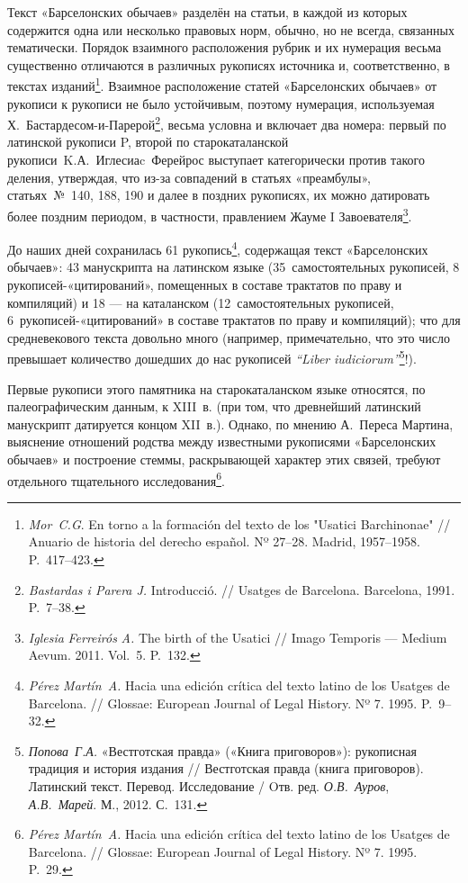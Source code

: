 Текст «Барселонских обычаев» разделён на статьи, в каждой из которых содержится одна или несколько правовых норм, обычно, но не всегда, связанных тематически. Порядок взаимного расположения рубрик и их нумерация весьма существенно отличаются в различных рукописях источника и, соответственно, в текстах изданий\footnote{\emph{Mor~C.G}. En torno a la formación del texto de los "Usatici Barchinonae" // Anuario de historia del derecho español. Nº 27--28. Madrid, 1957--1958. P.~417--423.}. Взаимное расположение статей «Барселонских обычаев» от рукописи к рукописи не было устойчивым, поэтому нумерация, используемая Х.~Бастардесом-и-Парерой\footnote{\emph{Bastardas i Parera J.} Introducció. // Usatges de Barcelona. Barcelona, 1991. P.~7--38.}, весьма условна и включает два номера: первый по латинской рукописи P, второй по старокаталанской рукописи~K.А.~Иглесиаc~Ферейрос выступает категорически против такого деления, утверждая, что из-за совпадений в статьях «преамбулы», статьях~№~140, 188, 190 и далее в поздних рукописях, их можно датировать более поздним периодом, в частности, правлением Жауме I Завоевателя\footnote{\emph{Iglesia }\emph{Ferreirós}\emph{ A.} The birth of the Usatici // Imago Temporis --- Medium Aevum. 2011. Vol.~5. P.~132.}.

До наших дней сохранилась 61 рукопись\footnote{\emph{Pérez Martín~A. }Hacia una edición crítica del texto latino de los Usatges de Barcelona. // Glossae: European Journal of Legal History. Nº 7. 1995. P.~9--32.}, содержащая текст «Барселонских обычаев»: 43 манускрипта на латинском языке (35~самостоятельных рукописей, 8 рукописей-«цитирований», помещенных в составе трактатов по праву и компиляций) и 18 --- на каталанском (12~самостоятельных рукописей, 6~рукописей-«цитирований» в составе трактатов по праву и компиляций); что для средневекового текста довольно много (например, примечательно, что это число превышает количество дошедших до нас рукописей \emph{“}\emph{Liber}\emph{ }\emph{iudiciorum}\emph{”}\footnote{\emph{Попова~Г.А.} «Вестготская правда» («Книга приговоров»): рукописная традиция и история издания // Вестготская правда (книга приговоров). Латинский текст. Перевод. Исследование / Oтв. ред. \emph{О.В.~Ауров}, \emph{А.В.~Марей}. М., 2012. С.~131.}!).

Первые рукописи этого памятника на старокаталанском языке относятся, по палеографическим данным, к XIII~в. (при том, что древнейший латинский манускрипт датируется концом XII~в.). Однако, по мнению А.~Переса Мартина, выяснение отношений родства между известными рукописями «Барселонских обычаев» и построение стеммы, раскрывающей характер этих связей, требуют отдельного тщательного исследования\footnote{\emph{Pérez Martín~A. }Hacia una edición crítica del texto latino de los Usatges de Barcelona. // Glossae: European Journal of Legal History. Nº 7. 1995. P.~29.}.

